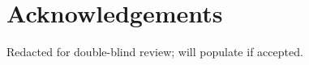 \section{Acknowledgements}\label{sec:acknowledgements}

Redacted for double-blind review; will populate if accepted.

% 

